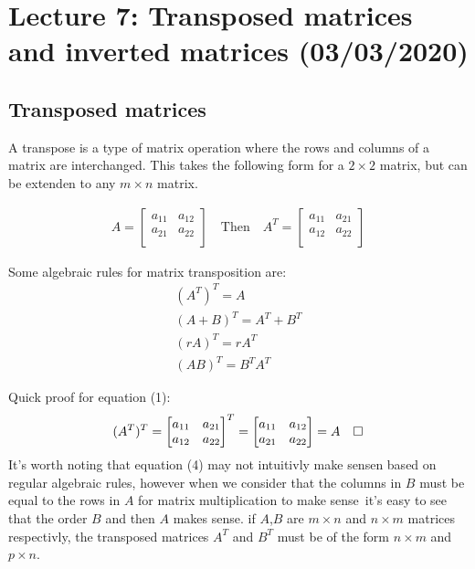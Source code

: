 \documentclass[11pt, a4paper]{article}
\newcommand*{\qed}{\hfill\ensuremath{\quad\square}}%
\begin{document}
\setcounter{section}{6}
\section{Lecture 7: Transposed matrices and inverted matrices (03/03/2020)}
\subsection{Transposed matrices}
A transpose is a type of matrix operation where the rows and columns of a matrix are interchanged.
This takes the following form for a $2 \times 2$ matrix, but can be extenden to any $m \times n$ matrix.

\begin{align*}
  A = 
  \begin{bmatrix}
    a_{11} & a_{12}\\
    a_{21} & a_{22}\\
  \end{bmatrix}
  \quad \text{Then} \quad 
  A^T = 
  \begin{bmatrix}
    a_{11} & a_{21}\\
    a_{12} & a_{22}\\
  \end{bmatrix}
\end{align*}

Some algebraic rules for matrix transposition are:
\begin{gather}
  (A^T)^T = A\\
  (A + B)^T = A^T + B^T\\
  (rA)^T = rA^T\\
  (AB)^T = B^TA^T
\end{gather}

Quick proof for equation (1):
\begin{gather*}
  (A^T)^T = 
  \begin{bmatrix}
    a_{11} & a_{21}\\
    a_{12} & a_{22}\\
  \end{bmatrix} ^T
  =
  \begin{bmatrix}
    a_{11} & a_{12}\\
    a_{21} & a_{22}\\
  \end{bmatrix}
  = A \qed
\end{gather*}
It's worth noting that equation (4) may not intuitivly make sensen based on regular algebraic rules, however
when we consider that the columns in $B$ must be equal to the rows in $A$ for matrix multiplication to make sense\
it's easy to see that the order $B$ and then $A$ makes sense. 
if $A$,$B$ are $m \times n$ and $n \times m$ matrices respectivly, the transposed matrices $A^T$ and $B^T$ must be of the form $n \times m$ and $p \times n$.
\end{document}
